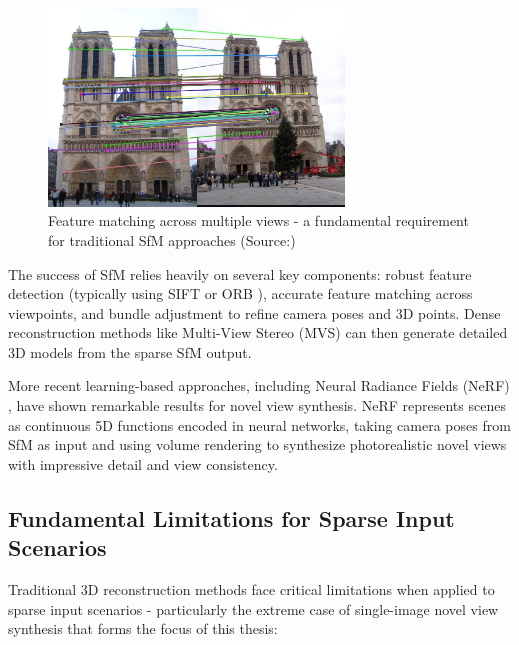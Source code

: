 \begin{figure}[h]
  \centering
  \includegraphics[width=0.7\textwidth]{images/related-work/feature-matching.jpg}
  \caption{Feature matching across multiple views - a fundamental requirement for traditional SfM approaches (Source:\cite{image_matching})}
  \label{fig:matching-features}
\end{figure}

The success of SfM relies heavily on several key components: robust feature detection (typically using SIFT \cite{sift} or ORB \cite{orb}), accurate feature matching across viewpoints, and bundle adjustment to refine camera poses and 3D points. Dense reconstruction methods like Multi-View Stereo (MVS) can then generate detailed 3D models from the sparse SfM output.

More recent learning-based approaches, including Neural Radiance Fields (NeRF) \cite{nerf}, have shown remarkable results for novel view synthesis. NeRF represents scenes as continuous 5D functions encoded in neural networks, taking camera poses from SfM as input and using volume rendering to synthesize photorealistic novel views with impressive detail and view consistency.

\subsection{Fundamental Limitations for Sparse Input Scenarios}

Traditional 3D reconstruction methods face critical limitations when applied to sparse input scenarios - particularly the extreme case of single-image novel view synthesis that forms the focus of this thesis:

